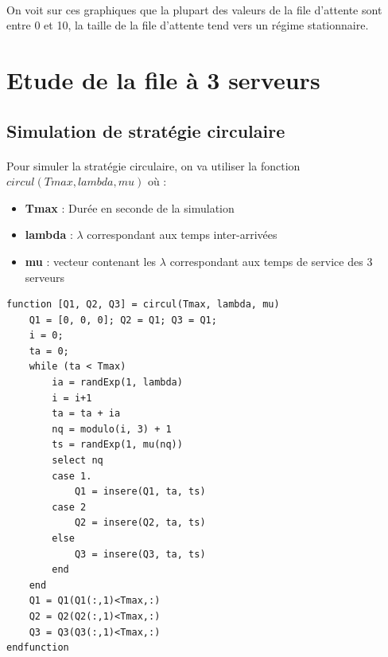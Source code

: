 \documentclass{article}
\begin{document}
\paragraph{} On voit sur ces graphiques que la plupart des valeurs de la file d'attente sont entre 0 et 10, la taille de la file d'attente tend vers un régime stationnaire.

\section{Etude de la file à 3 serveurs}

\subsection{Simulation de stratégie circulaire}
\paragraph{}
Pour simuler la stratégie circulaire, on va utiliser la fonction $circul(Tmax,lambda,mu)$ où :
\begin{itemize}
	\item \textbf{Tmax} : Durée en seconde de la simulation
	\item \textbf{lambda} : $\lambda$ correspondant aux temps inter-arrivées
	\item \textbf{mu} : vecteur contenant les $\lambda$ correspondant aux temps de service des 3 serveurs
\end{itemize}
\begin{verbatim}
function [Q1, Q2, Q3] = circul(Tmax, lambda, mu)
    Q1 = [0, 0, 0]; Q2 = Q1; Q3 = Q1;
    i = 0; 
    ta = 0; 
    while (ta < Tmax)
        ia = randExp(1, lambda) 
        i = i+1 
        ta = ta + ia
        nq = modulo(i, 3) + 1
        ts = randExp(1, mu(nq))
        select nq 
        case 1.
            Q1 = insere(Q1, ta, ts)
        case 2 
            Q2 = insere(Q2, ta, ts)
        else
            Q3 = insere(Q3, ta, ts)
        end
    end
    Q1 = Q1(Q1(:,1)<Tmax,:)
    Q2 = Q2(Q2(:,1)<Tmax,:) 
    Q3 = Q3(Q3(:,1)<Tmax,:) 
endfunction 
\end{verbatim}
%
%
\end{document}
